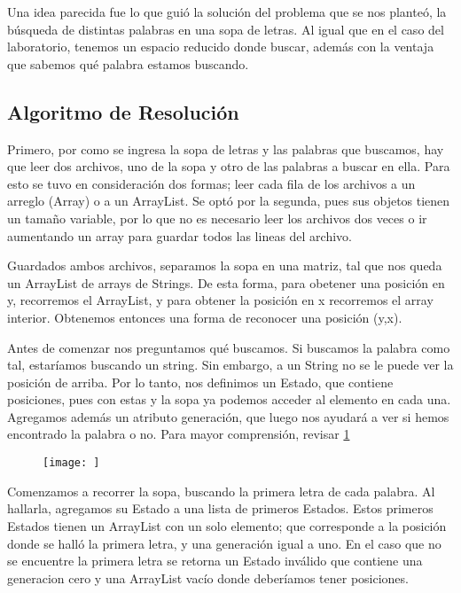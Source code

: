 \documentclass{article}
\begin{document}
    Una idea parecida fue lo que guió la solución del problema que se nos planteó,
    la búsqueda de distintas palabras en una sopa de letras. Al igual que en el caso
    del laboratorio, tenemos un espacio reducido donde buscar, además con la ventaja
    que sabemos qué palabra estamos buscando.

    \subsection{Algoritmo de Resolución}

    Primero, por como se ingresa la sopa de letras y las palabras que buscamos,
    hay que leer dos archivos, uno de la sopa y otro de las palabras a buscar en
    ella. Para esto se tuvo en consideración dos formas; leer cada fila de los
    archivos a un arreglo (Array) o a un ArrayList.
    Se optó por la segunda, pues sus objetos tienen un tamaño variable, por lo que
    no es necesario leer los archivos dos veces o ir aumentando un array para guardar
    todos las lineas del archivo.


    Guardados ambos archivos, separamos la sopa en una matriz, tal que nos queda
    un ArrayList de arrays de Strings. De esta forma, para obetener una posición en
    y, recorremos el ArrayList, y para obtener la posición en x recorremos el array
    interior.
    Obtenemos entonces una forma de reconocer una posición (y,x).


    Antes de comenzar nos preguntamos qué buscamos. Si buscamos la palabra como tal,
    estaríamos buscando un string. Sin embargo, a un String no se le puede ver la
    posición de arriba. Por lo tanto, nos definimos un Estado, que contiene posiciones,
    pues con estas y la sopa ya podemos acceder al elemento en cada una. Agregamos
    además un atributo generación, que luego nos ayudará a ver si hemos encontrado
    la palabra o no. Para mayor comprensión, revisar \ref{fig: 1}

    \begin{figure}
      \centering
      \texttt{[image: ]}
      \caption{}
      \label{fig: 1}

    \end{figure}

    Comenzamos a recorrer la sopa, buscando la primera letra de cada palabra. Al
    hallarla, agregamos su Estado a una lista de primeros Estados. Estos primeros
    Estados tienen un ArrayList con un solo elemento; que corresponde a la posición
    donde se halló la primera letra, y una generación igual a uno.
    En el caso que no se encuentre la primera letra se retorna un Estado inválido
    que contiene una generacion cero y una ArrayList vacío donde deberíamos tener
    posiciones.
\end{document}
